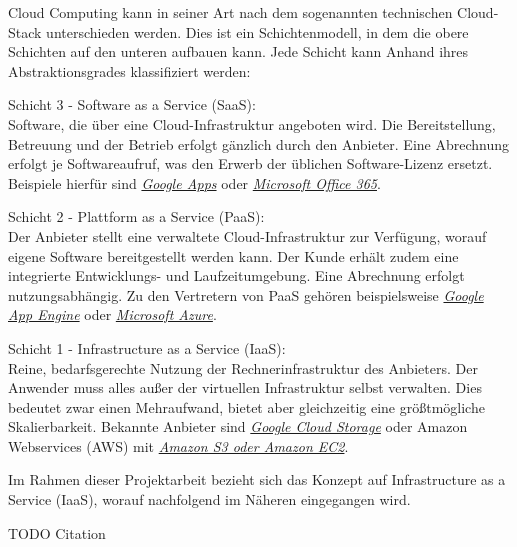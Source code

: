 \documentclass[12pt,a4paper,bibliography=totocnumbered,listof=totocnumbered]{scrartcl}
\begin{document}
Cloud Computing kann in seiner Art nach dem sogenannten technischen Cloud-Stack unterschieden werden. Dies ist ein Schichtenmodell, in dem die obere Schichten auf den unteren aufbauen kann. Jede Schicht kann Anhand ihres Abstraktionsgrades klassifiziert werden:

\begin{compactitem}
\item Schicht 3 - Software as a Service (SaaS):\\
Software, die über eine Cloud-Infrastruktur angeboten wird. Die Bereitstellung, Betreuung und der Betrieb erfolgt gänzlich durch den Anbieter. Eine Abrechnung erfolgt je Softwareaufruf, was den Erwerb der üblichen Software-Lizenz ersetzt. Beispiele hierfür sind \href{http://www.google.com/enterprise/apps/business/}{\textit{Google Apps}} oder \href{http://office.microsoft.com/de-de/business/was-ist-office-365-fur-unternehmen-FX102997580.aspx}{\textit{Microsoft Office 365}}.
\item Schicht 2 - Plattform as a Service (PaaS):\\
Der Anbieter stellt eine verwaltete Cloud-Infrastruktur zur Verfügung, worauf eigene Software bereitgestellt werden kann. Der Kunde erhält zudem eine integrierte Entwicklungs- und Laufzeitumgebung. Eine Abrechnung erfolgt nutzungsabhängig. Zu den Vertretern von PaaS gehören beispielsweise \href{https://cloud.google.com/appengine/}{\textit{Google App Engine}} oder \href{http://azure.microsoft.com/de-de/}{\textit{Microsoft Azure}}.
\item Schicht 1 - Infrastructure as a Service (IaaS):\\
Reine, bedarfsgerechte Nutzung der Rechnerinfrastruktur des Anbieters. Der Anwender muss alles außer der virtuellen Infrastruktur selbst verwalten. Dies bedeutet zwar einen Mehraufwand, bietet aber gleichzeitig eine größtmögliche Skalierbarkeit. Bekannte Anbieter sind \href{https://cloud.google.com/storage/}{\textit{Google Cloud Storage}} oder Amazon Webservices (AWS) mit \href{http://aws.amazon.com/de/}{\textit{Amazon S3 oder Amazon EC2}}.
\end{compactitem}

Im Rahmen dieser Projektarbeit bezieht sich das Konzept auf Infrastructure as a Service (IaaS), worauf nachfolgend im Näheren eingegangen wird.

TODO Citation
\end{document}
